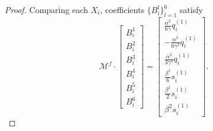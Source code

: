 \documentclass[11pt,letterpaper]{amsart}
\newcommand{\mM}{\mathcal{M}}
\theoremstyle{definition}
\theoremstyle{remark}
\numberwithin{equation}{section}
\begin{document}
\begin{proof}
Comparing each $X_i$, coefficients $\{B_i^l\}_{l=1}^6$ satisfy
    \begin{equation}\label{eq:B}
   \mM^f\cdot \begin{bmatrix}
        B_i^1\\
        B_i^2\\
        B_i^3\\
        B_i^4\\
        B_i^5\\
        B_i^6
    \end{bmatrix}=\begin{bmatrix}
        \frac{\alpha^2}{6\gamma}q^{(1)}_i\\
         -\frac{\alpha^2}{6\gamma^2}q^{(1)}_i\\
         \frac{\alpha^2}{3\gamma^3}q^{(1)}_i\\
        \frac{\beta^2}{6}s^{(1)}_i\\
        \frac{\beta^2}{2} s^{(1)}_i\\
        \beta^2 s^{(1)}_i
    \end{bmatrix}.
\end{equation}


\end{proof}
\end{document}

